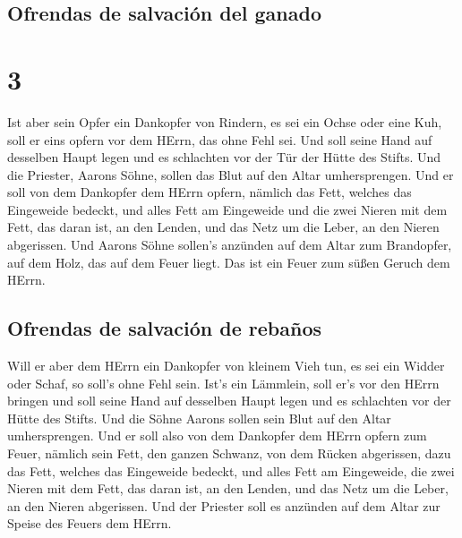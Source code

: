 \hypertarget{ofrendas-de-salvaciuxf3n-del-ganado}{%
\subsection{Ofrendas de salvación del
ganado}\label{ofrendas-de-salvaciuxf3n-del-ganado}}

\hypertarget{section-2}{%
\section{3}\label{section-2}}

 Ist aber sein Opfer ein Dankopfer von Rindern, es sei ein
Ochse oder eine Kuh, soll er eins opfern vor dem HErrn, das ohne Fehl
sei.  Und soll seine Hand auf desselben Haupt legen und es
schlachten vor der Tür der Hütte des Stifts. Und die Priester, Aarons
Söhne, sollen das Blut auf den Altar umhersprengen.  Und
er soll von dem Dankopfer dem HErrn opfern, nämlich das Fett, welches
das Eingeweide bedeckt, und alles Fett am Eingeweide  und
die zwei Nieren mit dem Fett, das daran ist, an den Lenden, und das Netz
um die Leber, an den Nieren abgerissen.  Und Aarons Söhne
sollen's anzünden auf dem Altar zum Brandopfer, auf dem Holz, das auf
dem Feuer liegt. Das ist ein Feuer zum süßen Geruch dem HErrn.

\hypertarget{ofrendas-de-salvaciuxf3n-de-rebauxf1os}{%
\subsection{Ofrendas de salvación de
rebaños}\label{ofrendas-de-salvaciuxf3n-de-rebauxf1os}}

 Will er aber dem HErrn ein Dankopfer von kleinem Vieh
tun, es sei ein Widder oder Schaf, so soll's ohne Fehl sein.
 Ist's ein Lämmlein, soll er's vor den HErrn bringen
 und soll seine Hand auf desselben Haupt legen und es
schlachten vor der Hütte des Stifts. Und die Söhne Aarons sollen sein
Blut auf den Altar umhersprengen.  Und er soll also von
dem Dankopfer dem HErrn opfern zum Feuer, nämlich sein Fett, den ganzen
Schwanz, von dem Rücken abgerissen, dazu das Fett, welches das
Eingeweide bedeckt, und alles Fett am Eingeweide,  die
zwei Nieren mit dem Fett, das daran ist, an den Lenden, und das Netz um
die Leber, an den Nieren abgerissen.  Und der Priester
soll es anzünden auf dem Altar zur Speise des Feuers dem HErrn.

